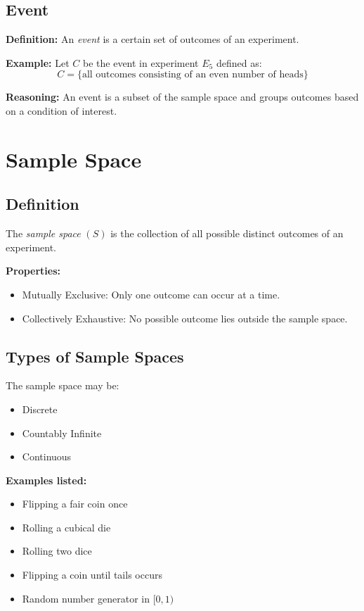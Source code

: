 \documentclass[12pt,a4paper]{article}
\begin{document}
\subsection{Event}

\textbf{Definition:}  
An \textit{event} is a certain set of outcomes of an experiment.

\textbf{Example:}  
Let $C$ be the event in experiment $E_5$ defined as:
\[
C = \{\text{all outcomes consisting of an even number of heads}\}
\]

\textbf{Reasoning:}  
An event is a subset of the sample space and groups outcomes based on a condition of interest.

\section{Sample Space}

\subsection{Definition}

The \textit{sample space} $(S)$ is the collection of all possible distinct outcomes of an experiment.

\textbf{Properties:}
\begin{itemize}
    \item Mutually Exclusive: Only one outcome can occur at a time.
    \item Collectively Exhaustive: No possible outcome lies outside the sample space.
\end{itemize}

\subsection{Types of Sample Spaces}

The sample space may be:
\begin{itemize}
    \item Discrete
    \item Countably Infinite
    \item Continuous
\end{itemize}

\textbf{Examples listed:}
\begin{itemize}
    \item Flipping a fair coin once
    \item Rolling a cubical die
    \item Rolling two dice
    \item Flipping a coin until tails occurs
    \item Random number generator in $[0,1)$
\end{itemize}
\end{document}
